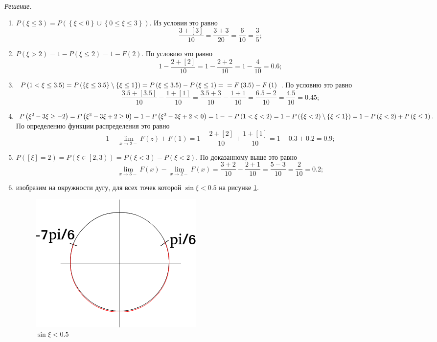 \textit{Решение.}
\begin{enumerate}[label=\alph*)]
\item $P \left( \xi \leq 3 \right) = P \left( \left\{ \xi < 0 \right\} \cup \left\{ 0 \leq \xi \leq 3 \right\} \right) $.
Из условия это равно
$$ \frac{3+ \left[ 3 \right] }{10} =
\frac{3+3}{20} =
\frac{6}{10} =
\frac{3}{5};$$
\item $P \left( \xi > 2 \right) = 1 - P \left( \xi \leq 2 \right) = 1 - F \left( 2 \right) $.
По условию это равно
$$1 - \frac{2+ \left[ 2 \right] }{10} =
1 - \frac{2+2}{10} =
1 - \frac{4}{10} =
0.6;$$
\item $P \left( 1 < \xi \leq 3.5 \right) =
P \left( \left\{ \xi \leq 3.5 \right\} \setminus \left\{ \xi \leq 1 \right\} \right) =
P \left( \xi \leq 3.5 \right) - P \left( \xi \leq 1 \right) = \\
= F \left( 3.5 \right) - F \left( 1 \right) $.
По условию это равно
$$ \frac{3.5+ \left[ 3.5 \right] }{10} - \frac{1+ \left[ 1 \right] }{10} =
\frac{3.5+3}{10} - \frac{1+1}{10} =
\frac{6.5-2}{10} =
\frac{4.5}{10} =
0.45;$$
\item $P \left( \xi^2 - 3 \xi \geq -2 \right) =
P \left( \xi^2-3 \xi + 2 \geq 0 \right) =
1 - P \left( \xi^2 - 3 \xi + 2 < 0 \right) =
1 - \\
- P \left( 1 < \xi < 2 \right) =
1 - P \left( \left\{ \xi < 2 \right) \setminus \left\{ \xi \leq 1 \right\} \right) =
1 - P \left( \xi < 2 \right) + P \left( \xi \leq 1 \right).$
По определению функции распределения это равно
$$1 - \lim \limits_{x \to 2-} F \left( z \right) + F \left( 1 \right) =
1 - \frac{2+ \left[ 2 \right] }{10} + \frac{1+ \left[ 1 \right] }{10} =
1 - 0.3 + 0.2 =
0.9;$$
\item $P \left( \left[ \xi \right] = 2 \right) =
P \left( \xi \in \left[ 2, 3 \right) \right) =
P \left( \xi < 3 \right) - P \left( \xi < 2 \right) $.
По доказанному выше это равно
$$ \lim \limits_{x \to 3-} F \left( x \right) - \lim \limits_{x \to 2-} F \left( x \right) =
\frac{3+2}{10} - \frac{2+1}{10} =
\frac{5-3}{10} =
\frac{2}{10} =
0.2;$$
\item изобразим на окружности дугу, для всех точек которой $ \sin \xi < 0.5$ на рисунке \ref{fig:919}.

\begin{figure}[h!]
  \centering
  \includegraphics[width=.4\textwidth]{./pictures/9_19.png}
  \caption{$ \sin \xi < 0.5$}
  \label{fig:919}
\end{figure}


\end{enumerate}
